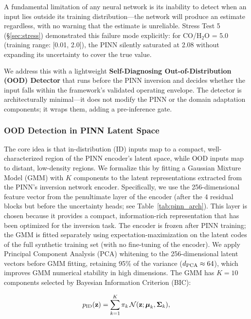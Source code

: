 \documentclass[usenatbib]{mnras}
\begin{document}
A fundamental limitation of any neural network is its inability to detect when an input lies outside its training distribution---the network will produce an estimate regardless, with no warning that the estimate is unreliable. Stress Test 5 (\S\ref{sec:stress}) demonstrated this failure mode explicitly: for CO/H$_2$O = 5.0 (training range: [0.01, 2.0]), the PINN silently saturated at 2.08 without expanding its uncertainty to cover the true value.

We address this with a lightweight \textbf{Self-Diagnosing Out-of-Distribution (OOD) Detector} that runs before the PINN inversion and decides whether the input falls within the framework's validated operating envelope. The detector is architecturally minimal---it does not modify the PINN or the domain adaptation components; it wraps them, adding a pre-inference gate.

\subsubsection{OOD Detection in PINN Latent Space}

The core idea is that in-distribution (ID) inputs map to a compact, well-characterized region of the PINN encoder's latent space, while OOD inputs map to distant, low-density regions. We formalize this by fitting a Gaussian Mixture Model (GMM) with $K$ components to the latent representations extracted from the PINN's inversion network encoder. Specifically, we use the 256-dimensional feature vector from the penultimate layer of the encoder (after the 4 residual blocks but before the uncertainty heads; see Table~\ref{tab:pinn_arch}). This layer is chosen because it provides a compact, information-rich representation that has been optimized for the inversion task. The encoder is frozen after PINN training; the GMM is fitted separately using expectation-maximization on the latent codes of the full synthetic training set (with no fine-tuning of the encoder). We apply Principal Component Analysis (PCA) whitening to the 256-dimensional latent vectors before GMM fitting, retaining 95\% of the variance ($d_{\rm PCA} \approx 64$), which improves GMM numerical stability in high dimensions. The GMM has $K=10$ components selected by Bayesian Information Criterion (BIC):

\begin{equation}\label{eq:gmm}
p_{\rm ID}(\mathbf{z}) = \sum_{k=1}^{K} \pi_k \, \mathcal{N}(\mathbf{z}; \boldsymbol{\mu}_k, \boldsymbol{\Sigma}_k),
\end{equation}
\end{document}
